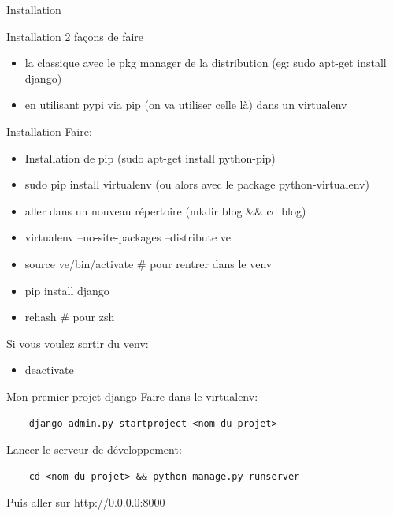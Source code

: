 \documentclass{beamer}
\begin{document}
\begin{frame}[fragile]{}
\begin{LARGE}
\begin{center}
Installation
\end{center}
\end{LARGE}
\end{frame}

\begin{frame}{Installation}
2 façons de faire
\begin{itemize}
    \item la classique avec le pkg manager de la distribution (eg: sudo apt-get install django)
    \item en utilisant pypi via pip (on va utiliser celle là) dans un virtualenv
\end{itemize}
\end{frame}

\begin{frame}{Installation}
    Faire:
    \begin{itemize}
        \item Installation de pip (sudo apt-get install python-pip)\pause
        \item sudo pip install virtualenv (ou alors avec le package python-virtualenv)\pause
        \item aller dans un nouveau répertoire (mkdir blog \&\& cd blog)\pause
        \item virtualenv --no-site-packages --distribute ve\pause
        \item source ve/bin/activate \# pour rentrer dans le venv\pause
        \item pip install django\pause
        \item rehash \# pour zsh
    \end{itemize}
    \vspace{3mm}
    \pause
    Si vous voulez sortir du venv:
    \begin{itemize}
        \item deactivate
    \end{itemize}
\end{frame}

\begin{frame}[fragile]{Mon premier projet django}
    Faire dans le virtualenv:
            \begin{verbatim}
    django-admin.py startproject <nom du projet>
            \end{verbatim}
    \pause
    Lancer le serveur de développement:
    \begin{verbatim}
    cd <nom du projet> && python manage.py runserver
    \end{verbatim}
    Puis aller sur http://0.0.0.0:8000
\end{frame}
\end{document}
